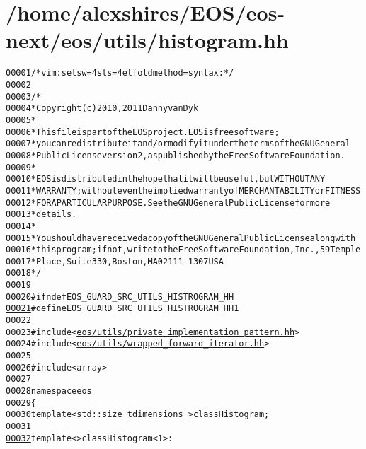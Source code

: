 \hypertarget{histogram_8hh_source}{
\section{/home/alexshires/EOS/eos-\/next/eos/utils/histogram.hh}
}


\begin{footnotesize}\begin{alltt}
00001 \textcolor{comment}{/* vim: set sw=4 sts=4 et foldmethod=syntax : */}
00002 
00003 \textcolor{comment}{/*}
00004 \textcolor{comment}{ * Copyright (c) 2010, 2011 Danny van Dyk}
00005 \textcolor{comment}{ *}
00006 \textcolor{comment}{ * This file is part of the EOS project. EOS is free software;}
00007 \textcolor{comment}{ * you can redistribute it and/or modify it under the terms of the GNU General}
00008 \textcolor{comment}{ * Public License version 2, as published by the Free Software Foundation.}
00009 \textcolor{comment}{ *}
00010 \textcolor{comment}{ * EOS is distributed in the hope that it will be useful, but WITHOUT ANY}
00011 \textcolor{comment}{ * WARRANTY; without even the implied warranty of MERCHANTABILITY or FITNESS}
00012 \textcolor{comment}{ * FOR A PARTICULAR PURPOSE.  See the GNU General Public License for more}
00013 \textcolor{comment}{ * details.}
00014 \textcolor{comment}{ *}
00015 \textcolor{comment}{ * You should have received a copy of the GNU General Public License along with}
00016 \textcolor{comment}{ * this program; if not, write to the Free Software Foundation, Inc., 59 Temple}
00017 \textcolor{comment}{ * Place, Suite 330, Boston, MA  02111-1307  USA}
00018 \textcolor{comment}{ */}
00019 
00020 \textcolor{preprocessor}{#ifndef EOS\_GUARD\_SRC\_UTILS\_HISTROGRAM\_HH}
\hypertarget{histogram_8hh_source_l00021}{}\hyperlink{histogram_8hh_afe875e5b706ab37171b07b2bcaf37b66}{00021} \textcolor{preprocessor}{}\textcolor{preprocessor}{#define EOS\_GUARD\_SRC\_UTILS\_HISTROGRAM\_HH 1}
00022 \textcolor{preprocessor}{}
00023 \textcolor{preprocessor}{#include <\hyperlink{private__implementation__pattern_8hh}{eos/utils/private_implementation_pattern.hh}>}
00024 \textcolor{preprocessor}{#include <\hyperlink{wrapped__forward__iterator_8hh}{eos/utils/wrapped_forward_iterator.hh}>}
00025 
00026 \textcolor{preprocessor}{#include <array>}
00027 
00028 \textcolor{keyword}{namespace }eos
00029 \{
00030     \textcolor{keyword}{template} <std::\textcolor{keywordtype}{size\_t} dimensions\_> \textcolor{keyword}{class }Histogram;
00031 
\hypertarget{histogram_8hh_source_l00032}{}\hyperlink{classeos_1_1Histogram_3_011_01_4}{00032}     \textcolor{keyword}{template} <> \textcolor{keyword}{class }Histogram<1> :

\end{alltt}
\end{footnotesize}
